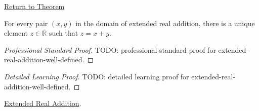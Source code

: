 \newpage
{}
\label{prf:extended-real-addition-well-defined}
\begin{remark*}[Return]
\hyperref[thm:extended-real-addition-well-defined]{Return to Theorem}
\end{remark*}
\begin{theorem*}
For every pair $(x,y)$ in the domain of extended real addition, there is a
unique element $z\in\overline{\mathbb{R}}$ such that $z=x+y$.
\end{theorem*}
\begin{proof}[Professional Standard Proof]
\LRAProofBodyStart
TODO: professional standard proof for extended-real-addition-well-defined.
\end{proof}
\begin{proof}[Detailed Learning Proof]
\LRAProofBodyStart
TODO: detailed learning proof for extended-real-addition-well-defined.
\end{proof}
\begin{remark*}
\end{remark*}
\begin{dependencies}
\hyperref[def:extended-real-addition]{Extended Real Addition}.
\end{dependencies}
\clearpage
